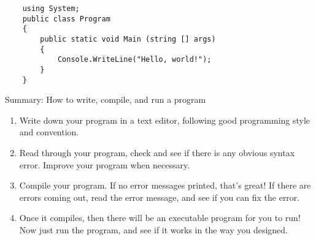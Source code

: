 \documentclass[../main.tex]{subfiles}
\begin{document}
    \begin{verbatim}
    using System;
    public class Program
    {
        public static void Main (string [] args)
        {
            Console.WriteLine("Hello, world!");
        }
    }
    \end{verbatim}

    Summary: How to write, compile, and run a program
    \begin{enumerate}
        \item Write down your program in a text editor, following good programming
        style and convention.
        \item Read through your program, check and see if there is any obvious
        syntax error. Improve your program when necessary.
        \item Compile your program. If no error messages printed, that's great!
        If there are errors coming out, read the error message, and see if you
        can fix the error.
        \item Once it compiles, then there will be an executable program for you
        to run! Now just run the program, and see if it works in the way you
        designed.
    \end{enumerate}
\end{document}

